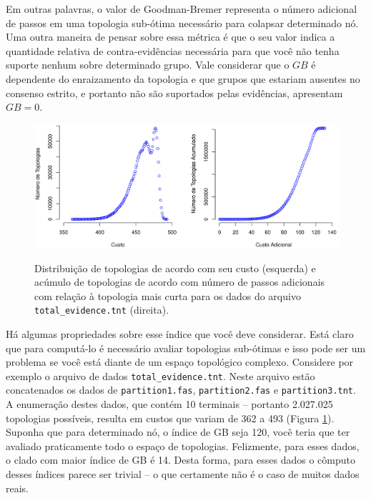 \begin{refsection}
Em outras palavras, o valor de Goodman-Bremer representa o número adicional de passos em uma topologia sub-ótima necessário para colapsar determinado nó. Uma outra maneira de pensar sobre essa métrica é que o seu valor indica a quantidade relativa de contra-evidências necessária para que você não tenha suporte nenhum sobre determinado grupo. Vale considerar que o $GB$ é dependente do enraizamento da topologia e que grupos que estariam ausentes no consenso estrito, e portanto não são suportados pelas evidências, apresentam $GB=0$.\\

  \begin{figure}[h!]
      {\includegraphics[scale=0.65]{figures/tut14/plot_alltrees.eps}}
	{\caption[Distribuição e acúmulo durante enumeração.]{Distribuição de topologias de acordo com seu custo (esquerda) e acúmulo de topologias de acordo com número de passos adicionais com relação à topologia mais curta para os dados do arquivo \texttt{total\_evidence.tnt} (direita).}\label{tut14:fig:bremer1}}
  \end{figure}


Há algumas propriedades sobre esse índice que você deve considerar. Está claro que para computá-lo é necessário avaliar topologias sub-ótimas e isso pode ser um problema se você está diante de um espaço topológico complexo. Considere por exemplo o arquivo de dados \texttt{total\_evidence.tnt}. Neste arquivo estão concatenados os dados de \texttt{partition1.fas}, \texttt{partition2.fas} e \texttt{partition3.tnt}. A enumeração destes dados, que contém 10 terminais -- portanto 2.027.025 topologias possíveis, resulta em custos que variam de 362 a 493 (Figura \ref{tut14:fig:bremer1}). Suponha que para determinado nó, o índice de GB seja 120, você teria que ter avaliado praticamente todo o espaço de topologias. Felizmente, para esses dados, o clado com maior índice de GB é 14. Desta forma, para esses dados o cômputo desses índices parece ser trivial -- o que certamente não é o caso de muitos dados reais.


\end{refsection}
